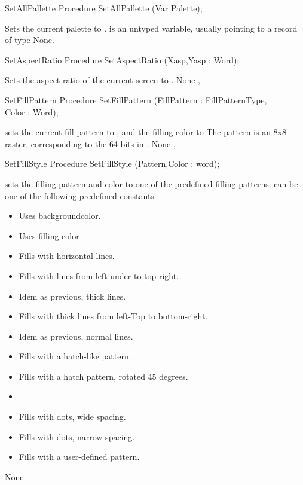 \begin{procedure}{SetAllPallette}
\Declaration
Procedure SetAllPallette (Var Palette);

\Description
Sets the current palette to
.  is an untyped variable, usually pointing to a
record of type 
\Errors
None.
\SeeAlso
{}
\end{procedure}
\begin{procedure}{SetAspectRatio}
\Declaration
Procedure SetAspectRatio (Xasp,Yasp : Word);

\Description
Sets the aspect ratio of the
current screen to .
\Errors
None
\SeeAlso
{}, 
\end{procedure}
\begin{procedure}{SetFillPattern}
\Declaration
Procedure SetFillPattern (FillPattern : FillPatternType,\\ Color : Word);

\Description
{} sets the current fill-pattern to , and
the filling color to 
The pattern is an 8x8 raster, corresponding to the 64 bits in
.
\Errors
None
\SeeAlso
{}, 
\end{procedure}
\begin{procedure}{SetFillStyle}
\Declaration
Procedure SetFillStyle (Pattern,Color : word);

\Description
{} sets the filling pattern and color to one of the
predefined filling patterns.  can be one of the following predefined
constants :
\begin{itemize}
\item {} Uses backgroundcolor.
\item {} Uses filling color
\item {} Fills with horizontal lines.
\item {} Fills with lines from left-under to top-right.
\item {} Idem as previous, thick lines.
\item {} Fills with thick lines from left-Top to bottom-right.
\item {} Idem as previous, normal lines.
\item {}  Fills with a hatch-like pattern.
\item {} Fills with a hatch pattern, rotated 45 degrees.
\item {} 
\item {} Fills with dots, wide spacing.
\item {} Fills with dots, narrow spacing.
\item {} Fills with a user-defined pattern.
\end{itemize}

\Errors
None.
\SeeAlso
{}
\end{procedure}
